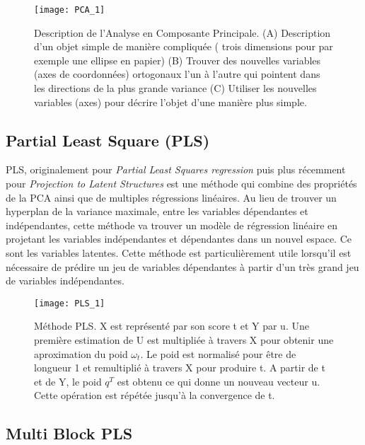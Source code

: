 \begin{figure}[h]
	\caption{\label{PCAdefinition} Description de l'Analyse en Composante Principale. (A) Description d'un objet simple de manière compliquée ( trois dimensions pour par exemple une ellipse en papier) (B) Trouver des nouvelles variables (axes de coordonnées) ortogonaux l'un à l'autre qui pointent dans les directions de la plus grande variance (C) Utiliser les nouvelles variables (axes) pour décrire l'objet d'une manière plus simple. }
	\texttt{[image: PCA\_1]}
\end{figure}

\newpage
\subsection{Partial Least Square (PLS)}


PLS, originalement pour \textit{Partial Least Squares regression} puis plus récemment pour \textit{Projection to Latent Structures} est une méthode qui combine des propriétés de la PCA ainsi que de multiples régressions linéaires. Au lieu de trouver un hyperplan de la variance maximale, entre les variables dépendantes et indépendantes, cette méthode va trouver un modèle de régression linéaire en projetant les variables indépendantes et dépendantes dans un nouvel espace. Ce sont les variables latentes. Cette méthode est particulièrement utile lorsqu'il est nécessaire de prédire un jeu de variables dépendantes à partir d'un très grand jeu de variables indépendantes. 

\begin{figure}[h]
	\texttt{[image: PLS\_1]}
	\caption{\label{PLSschema}Méthode PLS. X est représenté par son score t et Y par u. Une première estimation de U est multipliée à travers X pour obtenir une aproximation du poid $ \omega_t $. Le poid est normalisé pour être de longueur 1 et remultiplié à travers X pour produire t. A partir de t et de Y, le poid $ q^T $ est obtenu ce qui donne un nouveau vecteur u. Cette opération est répétée jusqu'à la convergence de t.}
\end{figure}

\subsection{Multi Block PLS}

